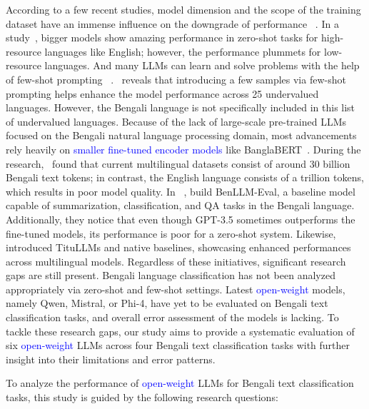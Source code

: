 \documentclass[10pt,letterpaper]{article}
\newcommand{\rev}[1]{\textcolor{blue}{#1}}
\begin{document}
According to a few recent studies, model dimension and the scope of the training dataset have an immense influence on the downgrade of performance ~\cite{b47}. In a study~\cite{b35}, bigger models show amazing performance in zero-shot tasks for high-resource languages like English; however, the performance plummets for low-resource languages. And many LLMs can learn and solve problems with the help of few-shot prompting ~\cite{b46}.~\cite{b43} reveals that introducing a few samples via few-shot prompting helps enhance the model performance across 25 undervalued languages. However, the Bengali language is not specifically included in this list of undervalued languages. Because of the lack of large-scale pre-trained LLMs focused on the Bengali natural language processing domain, most advancements rely heavily on \rev{smaller fine-tuned encoder models} like BanglaBERT~\cite{b4}. During the research,~\cite{b6} found that current multilingual datasets consist of around 30 billion Bengali text tokens; in contrast, the English language consists of a trillion tokens, which results in poor model quality. In ~\cite{b3}, build BenLLM-Eval, a baseline model capable of summarization, classification, and QA tasks in the Bengali language. Additionally, they notice that even though GPT-3.5 sometimes outperforms the fine-tuned models, its performance is poor for a zero-shot system. Likewise,~\cite{b21} introduced TituLLMs and native baselines, showcasing enhanced performances across multilingual models. Regardless of these initiatives, significant research gaps are still present. Bengali language classification has not been analyzed appropriately via zero-shot and few-shot settings. Latest \rev{open-weight} models, namely Qwen, Mistral, or Phi-4, have yet to be evaluated on Bengali text classification tasks, and overall error assessment of the models is lacking. To tackle these research gaps, our study aims to provide a systematic evaluation of six \rev{open-weight} LLMs across four Bengali text classification tasks with further insight into their limitations and error patterns.

To analyze the performance of \rev{open-weight} LLMs for Bengali text classification tasks, this study is guided by the following research questions:
\end{document}
